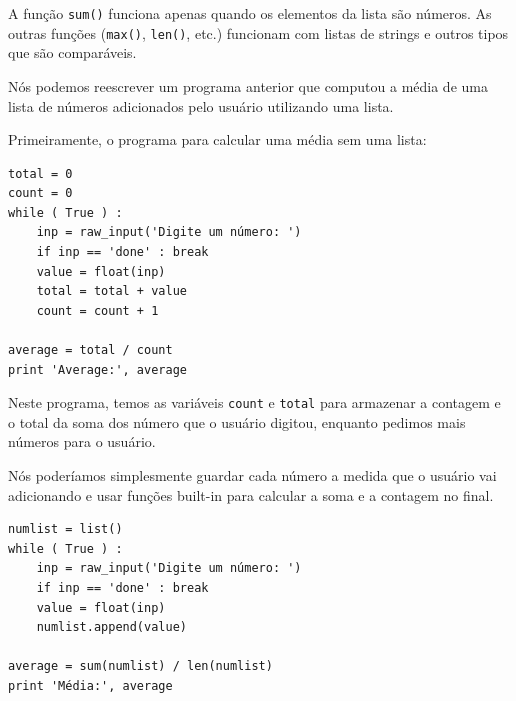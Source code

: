 A função {\tt sum()} funciona apenas quando os elementos da lista são números.
As outras funções ({\tt max()}, {\tt len()}, etc.) funcionam com listas de strings
e outros tipos que são comparáveis.

Nós podemos reescrever um programa anterior que computou a média de uma lista de 
números adicionados pelo usuário utilizando uma lista.

Primeiramente, o programa para calcular uma média sem uma lista:

\beforeverb
\begin{verbatim}
total = 0
count = 0
while ( True ) :
    inp = raw_input('Digite um número: ')
    if inp == 'done' : break
    value = float(inp)
    total = total + value
    count = count + 1

average = total / count
print 'Average:', average
\end{verbatim}
\afterverb
%
%

Neste programa, temos as variáveis {\tt count} e {\tt total} para armazenar
a contagem e o total da soma dos número que o usuário digitou, enquanto pedimos 
mais números para o usuário.

Nós poderíamos simplesmente guardar cada número a medida que o usuário vai 
adicionando e usar funções built-in para calcular a soma e a contagem no final.

\beforeverb
\begin{verbatim}
numlist = list()
while ( True ) :
    inp = raw_input('Digite um número: ')
    if inp == 'done' : break
    value = float(inp)
    numlist.append(value)

average = sum(numlist) / len(numlist)
print 'Média:', average
\end{verbatim}
\afterverb
%
%

